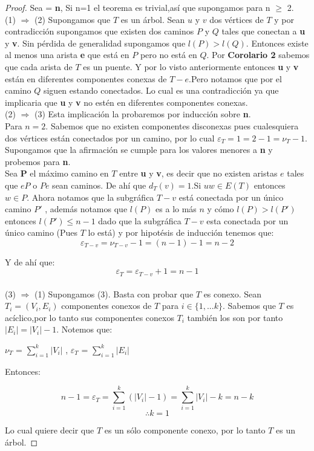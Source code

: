 \begin{proof}
Sea  = \textbf{n}, Si n=1 el teorema es trivial,así que supongamos para n $\geq$ 2.\\

    (1) $\Rightarrow$ (2) Supongamos que $T$ es un árbol. Sean $u$ y $v$ dos vértices de $T$ y por contradicción supongamos que existen dos caminos $P$ y $Q$ tales que conectan a \textbf{u} y \textbf{v}. Sin pérdida de generalidad supongamos que $l(P) > l(Q)$. Entonces existe al menos una arista \textbf{e} que está en $P$ pero no está en $Q$. Por \textbf{Corolario 2} sabemos que cada arista de $T$ es un puente. Y por lo visto anteriormente entonces \textbf{u} y \textbf{v} están en diferentes componentes conexas de $T-e$.Pero notamos que por el camino $Q$ siguen estando conectados. Lo cual es una contradicción ya que implicaria que \textbf{u} y \textbf{v} no estén en diferentes componentes conexas.\\

    (2) $\Rightarrow$ (3) Esta implicación la probaremos por inducción sobre \textbf{n}.
\\ Para $n=2$.
Sabemos que no existen componentes disconexas pues cualesquiera dos vértices están conectados por un camino, por lo cual $\varepsilon_T = 1 = 2-1= \nu_T -1$.
\\Supongamos que la afirmación se cumple para los valores menores a \textbf{n} y probemos para \textbf{n}.\\
Sea \textbf{P} el máximo camino en $T$ entre \textbf{u} y \textbf{v}, es decir que no existen aristas $e$ tales que $eP$  o $Pe$ sean caminos. De ahí que $d_T(v) = 1$.Si $uw \in E(T)$ entonces $w \in P$.
Ahora notamos que la subgráfica $T-v$ está conectada por un único camino $P'$ , además notamos que $l(P)$ es a lo más $n$ y cómo $l(P)>l(P')$ entonces $l(P') \leq n-1$ dado que la subgráfica $T-v$ esta conectada por un único camino (Pues $T$ lo está) y por hipotésis de inducción tenemos que:\\
\[\varepsilon_{T-v} = \nu_{T-v} - 1 = (n-1)-1 = n-2\]

Y de ahí que:
\[\varepsilon_T = \varepsilon_{T-v} + 1 = n-1\] \\
(3) $\Rightarrow$ (1) Supongamos (3). Basta con probar que $T$ es conexo.
Sean $T_i=(V_i,E_i)$ componentes conexos de $T$ para $i \in \{1,...k\}$. Sabemos que $T$ es acíclico,por lo tanto sus componentes conexos $T_i$ también los son por tanto $|E_i| = |V_i| - 1$.
Notemos que:
\begin{center}
    $\nu_T$ = $\sum_{i=1}^{k} |V_i|$
        ,
        $\varepsilon_T$ = $\sum_{i=1}^{k} |E_i|$
\end{center}
Entonces:

\begin{center}
    \[n-1 = \varepsilon_T = \sum_{i=1}^{k} (|V_i| - 1)= \sum_{i=1}^{k}|V_i| - k = n-k\] 
    \[\therefore k =1\]
\end{center}
Lo cual quiere decir que $T$ es un sólo componente conexo, por lo tanto $T$ es un árbol.    
\end{proof}


